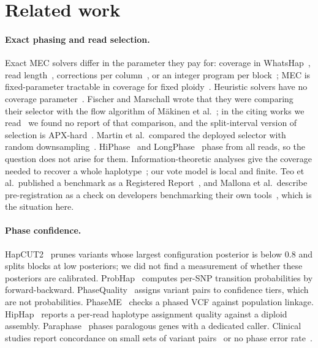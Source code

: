 \documentclass[11pt]{article}
\theoremstyle{definition}
\theoremstyle{remark}
\begin{document}
\section{Related work}\label{sec:related}

\paragraph{Exact phasing and read selection.} Exact MEC solvers differ in
the parameter they pay for: coverage in WhatsHap~\cite{patterson2015}, read
length~\cite{he2010}, corrections per column~\cite{pirola2016,beretta2018},
or an integer program per block~\cite{chen2013}; MEC is fixed-parameter
tractable in coverage for fixed ploidy~\cite{bonizzoni2016}. Heuristic
solvers have no coverage parameter~\cite{edge2017,duitama2012,das2015}.
Fischer and Marschall wrote that they were comparing their selector with the
flow algorithm of M\"akinen et al.~\cite{fischer2016,makinen2015}; in the
citing works we read~\cite{martin2016,beretta2018,garg2018} we found no
report of that comparison, and the split-interval version of selection is
APX-hard~\cite{bareyehuda2006}. Martin et al.\ compared the deployed selector
with random downsampling~\cite{martin2016}. HiPhase~\cite{holt2024} and
LongPhase~\cite{lin2022} phase from all reads, so the question does not arise
for them. Information-theoretic analyses give the coverage needed to recover
a whole haplotype~\cite{kamath2015,chen2016,mahajan2024}; our vote model is
local and finite. Teo et al.\ published a benchmark as a Registered
Report~\cite{teo2024}, and Mallona et al.\ describe pre-registration as a
check on developers benchmarking their own tools~\cite{mallona2025}, which is
the situation here.

\paragraph{Phase confidence.} HapCUT2~\cite{hapcut2} prunes variants whose
largest configuration posterior is below 0.8 and splits blocks at low
posteriors; we did not find a measurement of whether these posteriors are
calibrated. ProbHap~\cite{probhap} computes per-SNP transition
probabilities by forward-backward. PhaseQuality~\cite{damaraju2026} assigns
variant pairs to confidence tiers, which are not probabilities.
PhaseME~\cite{phaseme} checks a phased VCF against population linkage.
HipHap~\cite{hiphap} reports a per-read haplotype assignment quality against
a diploid assembly. Paraphase~\cite{chen2025paraphase} phases paralogous
genes with a dedicated caller. Clinical studies report concordance on small
sets of variant pairs~\cite{jamshidi2025} or no phase error
rate~\cite{devaney2026}.
\end{document}

